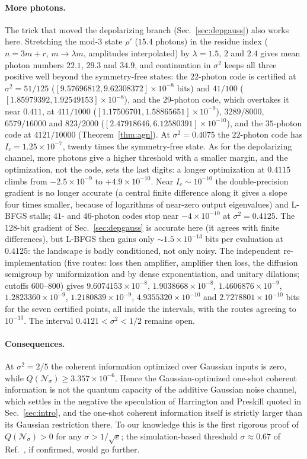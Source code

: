 \documentclass[aps,pra,reprint,superscriptaddress,nofootinbib,longbibliography,floatfix]{revtex4-2}
\theoremstyle{remark}
\newcommand{\Ic}{I_c}
\newcommand{\Nsig}{\mathcal{N}_\sigma}
\begin{document}
\paragraph*{More photons.} The trick that moved the depolarizing branch (Sec.~\ref{sec:depgauss}) also
works here. Stretching the mod-3 state $\rho'$ ($15.4$ photons) in the residue index ($n=3m+r$,
$m\to\lambda m$, amplitudes interpolated) by $\lambda=1.5$, $2$ and $2.4$ gives mean photon numbers $22.1$, $29.3$ and $34.9$,
and continuation in $\sigma^2$ keeps all three positive well beyond the symmetry-free states: the $22$-photon
code is certified at $\sigma^2=51/125$ ($[9.57696812,9.62308372]\times10^{-8}$ bits) and $41/100$
($[1.85979392,1.92549153]\times10^{-8}$), and the $29$-photon code, which overtakes it near $0.411$, at
$411/1000$ ($[1.17506701,1.58865651]\times10^{-9}$), $3289/8000$, $6579/16000$ and $823/2000$
($[2.47918646,6.12580391]\times10^{-10}$), and the $35$-photon code at $4121/10000$ (Theorem~\ref{thm:agn}).
At $\sigma^2=0.4075$ the $22$-photon code has $\Ic=1.25\times10^{-7}$, twenty times the symmetry-free state.
As for the depolarizing channel, more photons give a higher threshold with a smaller margin, and the
optimization, not the code, sets the last digits: a longer optimization at $0.4115$ climbs from
$-2.5\times10^{-9}$ to $+4.9\times10^{-10}$. Near $\Ic\sim10^{-10}$ the double-precision gradient is no longer
accurate (a central finite difference along it gives a slope four times smaller, because of logarithms of
near-zero output eigenvalues) and L-BFGS stalls; $41$- and $46$-photon codes stop near $-4\times10^{-10}$ at
$\sigma^2=0.4125$. The 128-bit gradient of Sec.~\ref{sec:depgauss} is accurate here (it agrees with finite
differences), but L-BFGS then gains only $\sim1.5\times10^{-13}$ bits per evaluation at $0.4125$: the landscape is
badly conditioned, not only noisy. The independent re-implementation (five routes: loss then
amplifier, amplifier then loss, the diffusion semigroup by uniformization and by dense exponentiation,
and unitary dilations; cutoffs 600--800) gives $9.6074153\times10^{-8}$, $1.9038668\times10^{-8}$,
$1.4606876\times10^{-9}$, $1.2823360\times10^{-9}$, $1.2180839\times10^{-9}$, $4.9355320\times10^{-10}$ and
$2.7278801\times10^{-10}$ bits for the seven certified points, all inside the intervals, with the routes agreeing to $10^{-13}$.
The interval $0.4121<\sigma^2<1/2$ remains open.

\paragraph*{Consequences.} At $\sigma^2=2/5$ the coherent information optimized over Gaussian inputs is
zero, while $Q(\Nsig)\ge3.357\times10^{-6}$. Hence the Gaussian-optimized one-shot coherent
information is not the quantum capacity of the additive Gaussian noise channel, which settles in the
negative the speculation of Harrington and Preskill quoted in Sec.~\ref{sec:intro}, and the
one-shot coherent information itself is strictly larger than its Gaussian restriction there. To our
knowledge this is the first rigorous proof of $Q(\Nsig)>0$ for any $\sigma>1/\sqrt e$; the
simulation-based threshold $\sigma\approx0.67$ of Ref.~\cite{zhang2023xzzx}, if confirmed, would go further.
\end{document}
